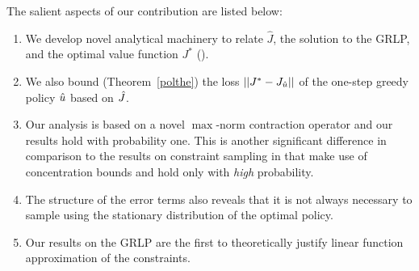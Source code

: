 The salient aspects of our contribution are listed below:
\begin{enumerate}
		\item We develop novel analytical machinery to relate $\hat{J}$, the solution to the GRLP, and the optimal value function $J^*$ (). 
		\item We also bound (Theorem~\ref{polthe}) the loss $||J^*-J_{\hat{u}}||$ of the one-step greedy policy $\hat{u}$ based on $\hat{J}$.
		\item Our analysis is based on a novel $\max$-norm contraction operator  and our results hold with probability one. This is another significant difference in comparison to the results on constraint sampling in \cite{SALP,CS} that make use of concentration bounds and hold only with \emph{high} probability.
		\item The structure of the error terms also reveals that it is not always necessary to sample using the stationary distribution of the optimal policy.
		\item Our results on the GRLP are the first to theoretically justify linear function approximation of the constraints.
\end{enumerate}

